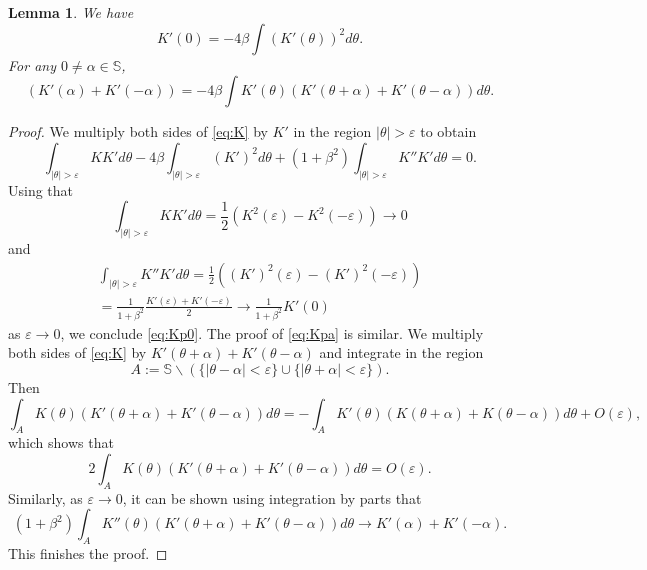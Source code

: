 \documentclass[10pt]{amsart}
\theoremstyle{plain}
\newtheorem{lemma}[theorem]{Lemma}
\theoremstyle{definition}
\let\alp\alpha
\let\bt\beta
\let\tht\theta
\newcommand{\bbS}{\mathbb S}
\begin{document}
\begin{lemma} We have\vspace*{-3pt}
\begin{equation}\label{eq:Kp0}
K'(0) = - 4\bt \int (K'(\tht))^2 d\tht.
\end{equation}
For any $0 \ne \alp \in \bbS$,\vspace*{-3pt}
\begin{equation}\label{eq:Kpa}
\left(K'(\alp) + K'(-\alp) \right)= -4\bt \int K'(\tht) \left(K'(\tht+\alp) + K'(\tht-\alp) \right) d\tht.
\end{equation}
\end{lemma}
\begin{proof}
We multiply both sides of \eqref{eq:K} by $K'$ in the region $|\tht|>\varepsilon$ to obtain
\begin{equation*}
\int_{ |\tht |>\varepsilon} KK' d\tht - 4\bt \int_{ |\tht |>\varepsilon} (K')^2d\tht + (1+\bt^2) \int_{ |\tht |>\varepsilon} K''K' d\tht = 0.
\end{equation*}
Using that\vspace*{-3pt}
\begin{equation*}
\int_{ |\tht |>\varepsilon} KK' d\tht = \frac12 \left(K^2(\varepsilon)-K^2(-\varepsilon) \right) \to 0
\end{equation*}
and\vspace*{-3pt}
\begin{multline*}
\int_{ |\tht |>\varepsilon} K''K' d\tht = \frac12 \left((K')^2(\varepsilon) - (K')^2(-\varepsilon) \right)\\[-7pt]
= \frac{1}{1+\bt^2} \frac{ K'(\varepsilon) + K'(-\varepsilon) }{2} \to \frac{1}{1+\bt^2} K'(0)
\end{multline*}
as $\varepsilon\to0$, we conclude \eqref{eq:Kp0}. The proof of \eqref{eq:Kpa} is similar. We multiply both sides of \eqref{eq:K} by $K'(\tht+\alp)+K'(\tht-\alp)$ and integrate in the region
\[
A:= \bbS\backslash (\{ |\tht-\alp|<\varepsilon \} \cup \{ |\tht+\alp|<\varepsilon \}).
\]
Then
\begin{equation*}
\int_A K(\tht) (K'(\tht+\alp)+K'(\tht-\alp)) d\tht = -\int_A K'(\tht) (K(\tht+\alp) + K(\tht-\alp)) d\tht + O(\varepsilon),
\end{equation*}
which shows that\vspace*{-3pt}
\begin{equation*}
2\int_A K(\tht) (K'(\tht+\alp)+K'(\tht-\alp)) d\tht = O(\varepsilon).
\end{equation*}
Similarly, as $\varepsilon\to0$, it can be shown using integration by parts that\vspace*{-3pt}
\begin{equation*}
(1+\bt^2)\int_{A} K''(\tht)(K'(\tht+\alp)+K'(\tht-\alp)) d\tht \to K'(\alp) + K'(-\alp).
\end{equation*}
This finishes the proof.
\end{proof}
\end{document}

